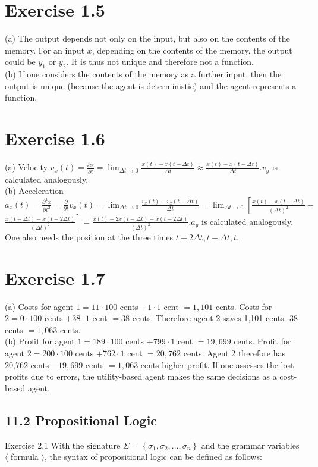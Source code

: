 \documentclass[10pt]{article}
\begin{document}
\section*{Exercise 1.5}
(a) The output depends not only on the input, but also on the contents of the memory. For an input $x$, depending on the contents of the memory, the output could be $y_{1}$ or $y_{2}$. It is thus not unique and therefore not a function.\\
(b) If one considers the contents of the memory as a further input, then the output is unique (because the agent is deterministic) and the agent represents a function.

\section*{Exercise 1.6}
(a) Velocity $v_{x}(t)=\frac{\partial x}{\partial t}=\lim _{\Delta t \rightarrow 0} \frac{x(t)-x(t-\Delta t)}{\Delta t} \approx \frac{x(t)-x(t-\Delta t)}{\Delta t} . v_{y}$ is calculated analogously.\\
(b) Acceleration $a_{x}(t)=\frac{\partial^{2} x}{\partial t^{2}}=\frac{\partial}{\partial t} v_{x}(t)=\lim _{\Delta t \rightarrow 0} \frac{v_{x}(t)-v_{x}(t-\Delta t)}{\Delta t}=\lim _{\Delta t \rightarrow 0}\left[\frac{x(t)-x(t-\Delta t)}{(\Delta t)^{2}}-\right.$ $\left.\frac{x(t-\Delta t)-x(t-2 \Delta t)}{(\Delta t)^{2}}\right]=\frac{x(t)-2 x(t-\Delta t)+x(t-2 \Delta t)}{(\Delta t)^{2}} . a_{y}$ is calculated analogously. One also needs the position at the three times $t-2 \Delta t, t-\Delta t, t$.

\section*{Exercise 1.7}
(a) Costs for agent $1=11 \cdot 100$ cents $+1 \cdot 1$ cent $=1,101$ cents. Costs for $2=0 \cdot 100$ cents $+38 \cdot 1$ cent $=38$ cents. Therefore agent 2 saves 1,101 cents -38 cents $=1,063$ cents.\\
(b) Profit for agent $1=189 \cdot 100$ cents $+799 \cdot 1$ cent $=19,699$ cents. Profit for agent $2=200 \cdot 100$ cents $+762 \cdot 1$ cent $=20,762$ cents. Agent 2 therefore has 20,762 cents $-19,699$ cents $=1,063$ cents higher profit. If one assesses the lost profits due to errors, the utility-based agent makes the same decisions as a cost-based agent.

\subsection*{11.2 Propositional Logic}
Exercise 2.1 With the signature $\Sigma=\left\{\sigma_{1}, \sigma_{2}, \ldots, \sigma_{n}\right\}$ and the grammar variables $\langle$ formula $\rangle$, the syntax of propositional logic can be defined as follows:
\end{document}
